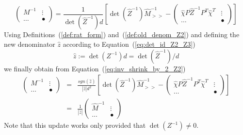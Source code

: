 \documentclass[a4paper]{article}
\begin{document}
\begin{equation}
\label{eq:inv_shrink_by_2_Z2}
\left(
\begin{array}{c|c}
M^{-1}  & \vdots \\
\hline
\hdots  & \bullet
\end{array}
\right)
=
\frac{1}{\det(\hat{Z}^{-1})d}
\left[
\det(\hat{Z}^{-1})\hat{M}_{>>}^{-1}
-
\left(
\begin{array}{c|c}
\hat{\chi} P\hat{Z}^{-1}P^{T} \hat{\chi}^{T} & \vdots \\
\hline
\hdots                           & \bullet
\end{array}
\right)
\right]
\end{equation}
Using Definitions~(\ref{def:rat_form}) and~(\ref{def:old_denom_Z2}) and
defining the new denominator $\hat{z}$ according to
Equation~(\ref{eq:det_id_Z2_Z3})
\begin{equation}
\label{def:new_denom_Z2}
\hat{z}:=\det(Z^{-1})d = \det(\hat{Z}^{-1}) / d
\end{equation}
we finally obtain from Equation~(\ref{eq:inv_shrink_by_2_Z2})
\begin{eqnarray}
\left(
\begin{array}{c|c}
M^{-1}  & \vdots \\
\hline
\hdots  & \bullet
\end{array}
\right)
&=&
\frac{sgn(\hat{z})}{\left|\hat{z}\right|d^{2}}
\left[
\det(\hat{Z}^{-1})\hat{M}_{>>}^{-1}
-
\left(
\begin{array}{c|c}
\hat{\chi} P\hat{Z}^{-1}P^{T} \hat{\chi}^{T} & \vdots \\
\hline
\hdots                           & \bullet	
\end{array}
\right)
\right]
\nonumber \\
&=&
\frac{1}{\left|\hat{z}\right|}
\left(
\begin{array}{c|c}
\hat{M}^{-1} & \vdots \\
\hline
\hdots       & \bullet
\end{array}
\right)
\end{eqnarray}
Note that this update works only provided that $\det(Z^{-1}) \neq 0$.
\end{document}
